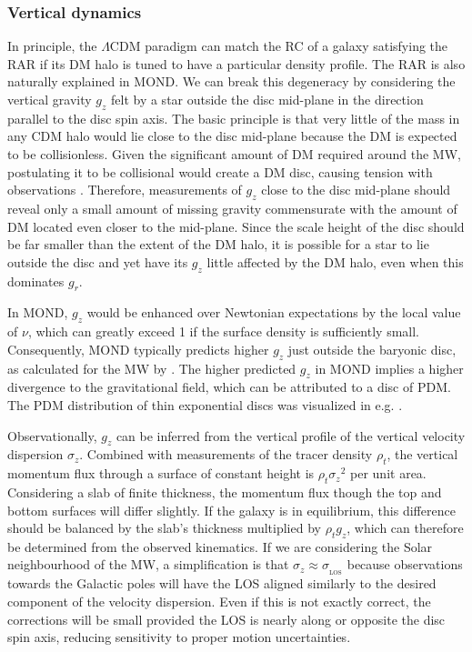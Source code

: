 \documentclass[fleqn,usenatbib,useAMS,onecolumn]{mnras} %
\begin{document}
\subsubsection{Vertical dynamics}
\label{Vertical_dynamics}

In principle, the $\Lambda$CDM paradigm can match the RC of a galaxy satisfying the RAR if its DM halo is tuned to have a particular density profile. The RAR is also naturally explained in MOND. We can break this degeneracy by considering the vertical gravity $g_z$ felt by a star outside the disc mid-plane in the direction parallel to the disc spin axis. The basic principle is that very little of the mass in any CDM halo would lie close to the disc mid-plane because the DM is expected to be collisionless. Given the significant amount of DM required around the MW, postulating it to be collisional would create a DM disc, causing tension with observations \citep*{Buch_2019}. Therefore, measurements of $g_z$ close to the disc mid-plane should reveal only a small amount of missing gravity commensurate with the amount of DM located even closer to the mid-plane. Since the scale height of the disc should be far smaller than the extent of the DM halo, it is possible for a star to lie outside the disc and yet have its $g_z$ little affected by the DM halo, even when this dominates $g_r$.

In MOND, $g_z$ would be enhanced over Newtonian expectations by the local value of $\nu$, which can greatly exceed 1 if the surface density is sufficiently small. Consequently, MOND typically predicts higher $g_z$ just outside the baryonic disc, as calculated for the MW by \citet{Bienayme_2009}. The higher predicted $g_z$ in MOND implies a higher divergence to the gravitational field, which can be attributed to a disc of PDM. The PDM distribution of thin exponential discs was visualized in e.g. \citet{Lughausen_2013, Lughausen_2015}.

Observationally, $g_z$ can be inferred from the vertical profile of the vertical velocity dispersion $\sigma_z$. Combined with measurements of the tracer density $\rho_t$, the vertical momentum flux through a surface of constant height is $\rho_t {\sigma_z}^2$ per unit area. Considering a slab of finite thickness, the momentum flux though the top and bottom surfaces will differ slightly. If the galaxy is in equilibrium, this difference should be balanced by the slab's thickness multiplied by $\rho_t g_z$, which can therefore be determined from the observed kinematics. If we are considering the Solar neighbourhood of the MW, a simplification is that $\sigma_z \approx \sigma_{_\text{LOS}}$ because observations towards the Galactic poles will have the LOS aligned similarly to the desired component of the velocity dispersion. Even if this is not exactly correct, the corrections will be small provided the LOS is nearly along or opposite the disc spin axis, reducing sensitivity to proper motion uncertainties.
\end{document}
